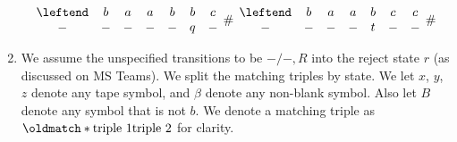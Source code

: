 \documentclass[12pt]{article}
\def\match{\oldmatch*}
\begin{document}
\begin{solution}
\begin{enumerate}[label=(\alph*)]
\begin{gather*}
            \begin{matrix}
                \leftend & b & a & a & b & b & c \\
                       - & - & - & - & - & q & - \\
            \end{matrix} \;\,\#\;\,
            \begin{matrix}
                \leftend & b & a & a & b & c & c \\
                       - & - & - & - & t & - & - \\
            \end{matrix} \;\,\#
        \end{gather*} \normalsize
        \item We assume the unspecified transitions to be ${-} / {-}, R$ into
        the reject state $r$ (as discussed on MS Teams).
        We split the matching triples by state.
        We let $x$, $y$, $z$ denote any tape symbol, and $\beta$ denote any
        non-blank symbol.
        Also let $B$ denote any symbol that is not $b$.
        We denote a matching triple as
        $\match{\text{triple 1}}{\text{triple 2}}$ for clarity.


\end{enumerate}
\end{solution}
\end{document}
